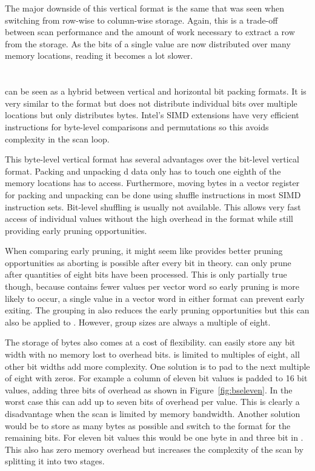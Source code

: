 The major downside of this vertical format is the same that was seen when
switching from row-wise to column-wise storage. Again, this is a trade-off
between scan performance and the amount of work necessary to extract a row from
the storage. As the bits of a single value are now distributed over many memory
locations, reading it becomes a lot slower.

\section{\bs{}}

\bs{} \cite{ByteSlice} can be seen as a hybrid between vertical and horizontal
bit packing formats. It is very similar to the \bwv{} format but does not
distribute individual bits over multiple locations but only distributes bytes.
Intel's SIMD extensions have very efficient instructions for byte-level
comparisons and permutations so this avoids complexity in the scan loop.

This byte-level vertical format has several advantages over the bit-level
vertical format. Packing and unpacking \bs{}d data only has to touch one eighth
of the memory locations \bwv{} has to access. Furthermore, moving bytes in a
vector register for packing and unpacking can be done using shuffle instructions
in most SIMD instruction sets. Bit-level shuffling is usually not available.
This allows very fast access of individual values without the high overhead in
the \bwv{} format while still providing early pruning opportunities.

When comparing early pruning, it might seem like \bwv{} provides better pruning
opportunities as aborting is possible after every bit in theory. \bs{} can only
prune after quantities of eight bits have been processed. This is only partially
true though, because \bs{} contains fewer values per vector word so early pruning
is more likely to occur, a single value in a vector word in either format can
prevent early exiting. The grouping in \bwv{} also reduces the early pruning
opportunities but this can also be applied to \bs{}. However, \bs{} group sizes
are always a multiple of eight.

The storage of bytes also comes at a cost of flexibility. \bwv{} can easily
store any bit width with no memory lost to overhead bits. \bs{} is limited to
multiples of eight, all other bit widths add more complexity. One solution is to
pad to the next multiple of eight with zeros. For example a column of eleven bit
values is padded to 16 bit values, adding three bits of overhead as shown in
Figure~\ref{fig:bseleven}. In the worst case this can add up to seven bits of
overhead per value. This is clearly a disadvantage when the scan is limited by
memory bandwidth. Another solution would be to store as many bytes as possible
and switch to the \bwv{} format for the remaining bits. For eleven bit values
this would be one byte in \bs{} and three bit in \bwv{}. This also has zero
memory overhead but increases the complexity of the scan by splitting it into
two stages.


